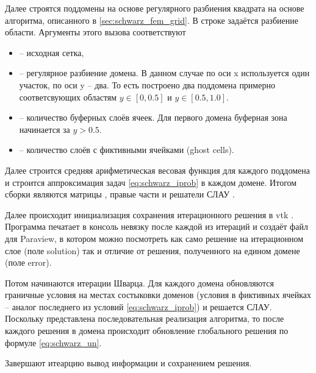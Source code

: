 Далее строятся поддомены на основе регулярного разбиения квадрата на основе алгоритма, описанного в \ref{sec:schwarz_fem_grid}.
В строке
задаётся разбиение области.
Аргументы этого вызова соответствуют
\begin{itemize}
\item {} -- исходная сетка,
\item {} -- регулярное разбиение домена. В данном случае по оси x используется один участок, по оси y -- два.
То есть построено два поддомена примерно соответсвующих областям $y\in[0, 0.5]$  и $y\in[0.5, 1.0]$.
\item {} -- количество буферных слоёв ячеек. Для первого домена буферная зона начинается за $y>0.5$.
\item {} -- количество слоёв с фиктивными ячейками (ghost cells).
\end{itemize}

Далее строится средняя арифметическая весовая функция для каждого поддомена  
и строится аппроксимация задач \cref{eq:schwarz_iprob} в каждом домене.
Итогом сборки являются матрицы , правые части 
и решатели СЛАУ .

Далее происходит инициализация сохранения итерационного решения в vtk .
Программа печатает в консоль невязку после каждой из итераций и создаёт файл 
для Paraview, в котором можно посмотреть как само решение на итерационном слое (поле solution) так и отличие от решения, полученного на едином домене (поле error).

Потом начинаются итерации Шварца.
Для каждого домена обновляются граничные условия на местах состыковки доменов (условия в фиктивных ячейках -- аналог последнего из условий \cref{eq:schwarz_iprob})
и решается СЛАУ.
Поскольку представлена последовательная реализация алгоритма, то после каждого решения в домена
происходит обновление глобального решения по формуле \cref{eq:schwarz_un}.

Завершают итеарцию вывод информации и сохранением решения.


